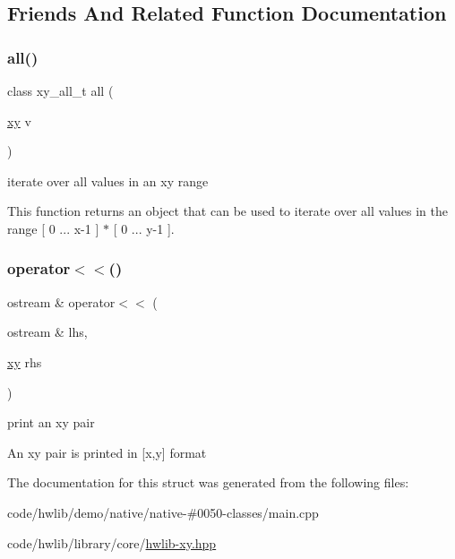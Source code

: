 \subsection{Friends And Related Function Documentation}
\mbox{\label{structxy_af0ac2823653fbb02e47de4315fb20a49}} 
\subsubsection{\texorpdfstring{all()}{all()}}
{\footnotesize\ttfamily class xy\+\_\+all\+\_\+t all (\begin{DoxyParamCaption}\item[{\hyperlink{structxy}{xy}}]{v }\end{DoxyParamCaption})\hspace{0.3cm}{\ttfamily [related]}}

iterate over all values in an xy range

This function returns an object that can be used to iterate over all values in the range \mbox{[} 0 ... x-\/1 \mbox{]} $\ast$ \mbox{[} 0 ... y-\/1 \mbox{]}. \mbox{\label{structxy_a74964e4e0c8376f138add4af02effce6}} 
\subsubsection{\texorpdfstring{operator$<$$<$()}{operator<<()}}
{\footnotesize\ttfamily ostream \& operator$<$$<$ (\begin{DoxyParamCaption}\item[{ostream \&}]{lhs,  }\item[{\hyperlink{structxy}{xy}}]{rhs }\end{DoxyParamCaption})\hspace{0.3cm}{\ttfamily [related]}}

print an xy pair

An xy pair is printed in \mbox{[}x,y\mbox{]} format 

The documentation for this struct was generated from the following files\+:\begin{DoxyCompactItemize}
\item 
code/hwlib/demo/native/native-\/\#0050-\/classes/main.\+cpp\item 
code/hwlib/library/core/\hyperlink{hwlib-xy_8hpp}{hwlib-\/xy.\+hpp}\end{DoxyCompactItemize}
